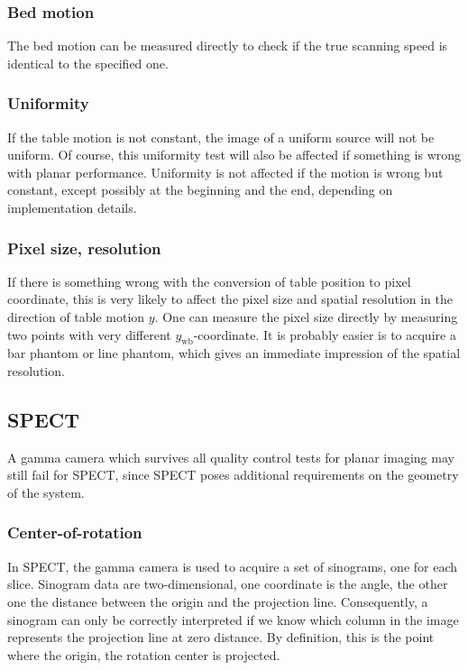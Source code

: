 \subsubsection{Bed motion}
The bed motion can be measured directly to check if the true scanning
speed is identical to the specified one.

\subsubsection{Uniformity}
If the table motion is not constant, the image of a uniform source will not be
uniform. Of course, this uniformity test will also be affected if something is
wrong with planar performance. Uniformity is not affected if the motion is
wrong but constant, except possibly at the beginning and the end, depending on
implementation details.

\subsubsection{Pixel size, resolution}
If there is something wrong with the conversion of table position to pixel
coordinate, this is very likely to affect the pixel size and spatial
resolution in the direction of table motion $y$. One can measure the pixel
size directly by measuring two points with very different
$y_{\mbox{wb}}$-coordinate. It is probably easier is to acquire a bar phantom
or line phantom, which gives an immediate impression of the spatial
resolution.


\subsection{SPECT}
A gamma camera which survives all quality control tests for planar
imaging may still fail for SPECT, since SPECT poses additional
requirements on the geometry of the system.

\subsubsection{Center-of-rotation}
In SPECT, the gamma camera is used to acquire a set of sinograms, one for each
slice. Sinogram data are two-dimensional, one coordinate is the angle, the
other one the distance between the origin and the projection
line. Consequently, a sinogram can only be correctly interpreted if we know
which column in the image represents the projection line at zero distance. By
definition, this is the point where the origin, the rotation center is
projected.

